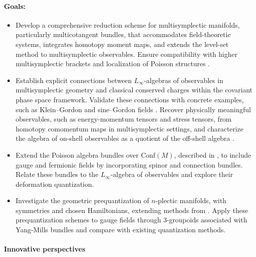 \documentclass[11pt,a4paper]{article}
\begin{document}
\paragraph{Goals:}
\begin{itemize}[noitemsep,topsep=0pt,parsep=0pt,partopsep=0pt]
    \item Develop a comprehensive reduction scheme for multisymplectic manifolds, particularly multicotangent bundles, that accommodates field-theoretic systems, integrates homotopy moment maps, and extends the level-set method to multisymplectic observables. Ensure compatibility with higher multisymplectic brackets and localization of Poisson structures \cite{Blacker2020}.
    
    \item Establish explicit connections between $L_\infty$-algebras of observables in multisymplectic geometry and classical conserved charges within the covariant phase space framework. Validate these connections with concrete examples, such as Klein–Gordon and sine–Gordon fields \cite{Rogers2010}. Recover physically meaningful observables, such as energy-momentum tensors and stress tensors, from homotopy comomentum maps in multisymplectic settings, and characterize the algebra of on-shell observables as a quotient of the off-shell algebra \cite{Forger2005}.
    
    \item Extend the Poisson algebra bundles over $\mathrm{Conf}(M)$, described in \cite{Frabetti2024}, to include gauge and fermionic fields by incorporating spinor and connection bundles. Relate these bundles to the $L_\infty$-algebra of observables and explore their deformation quantization.
    
    
    \item Investigate the geometric prequantization of $n$-plectic manifolds, with symmetries and chosen Hamiltonians, extending methods from \cite{Sevestre2021}. Apply these prequantization schemes to gauge fields through 3-groupoids associated with Yang-Mills bundles \cite{FischerPhd} and compare with existing quantization methods.
    
\end{itemize}


\paragraph{Innovative perspectives}
\end{document}
